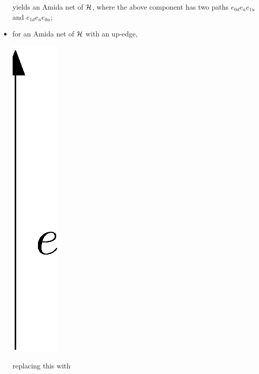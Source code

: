 \begin{definition}
\begin{itemize}
\begin{center}
	\end{center}
       yields an Amida net of $\mathcal{H}$,
       where the above component has two paths $e_{0d} e_a e_{1u}$
       and $e_{1d} e_a e_{0u}$;
 \item for an Amida net of $\mathcal{H}$ with an up-edge,
	\begin{center}
	 \includegraphics[scale=0.4]{oneedge.eps}
	\end{center}
       replacing this with
	\begin{center}

\end{center}
\end{itemize}
\end{definition}
